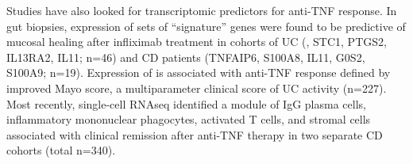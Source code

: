 \begin{outline}
Studies have also looked for transcriptomic predictors for anti-\gls{TNF} response\autocite{digby-bell2019InterrogatingHostImmunity,noor2020PersonalisedMedicineCrohn}.
In gut biopsies, expression of sets of \enquote{signature} genes were found to be predictive of mucosal healing after infliximab treatment in cohorts of \gls{UC} (, STC1, PTGS2, IL13RA2, IL11; n=46\autocite{arijs2009MucosalGeneSignatures}) 
and \gls{CD} patients (TNFAIP6, S100A8, IL11, G0S2, S100A9; n=19\autocite{arijs2010PredictiveValueEpithelial}).
Expression of  is associated with anti-\gls{TNF} response defined by improved Mayo score, a multiparameter clinical score of \gls{UC} activity (n=227)\autocite{west2017OncostatinDrivesIntestinal}.
Most recently, single-cell \gls{RNAseq} identified a module of IgG plasma cells, inflammatory mononuclear phagocytes, activated T cells, and stromal cells associated with clinical remission after anti-\gls{TNF} therapy in two separate \gls{CD} cohorts (total n=340)\autocite{martin2019SingleCellAnalysisCrohn}.


\end{outline}
